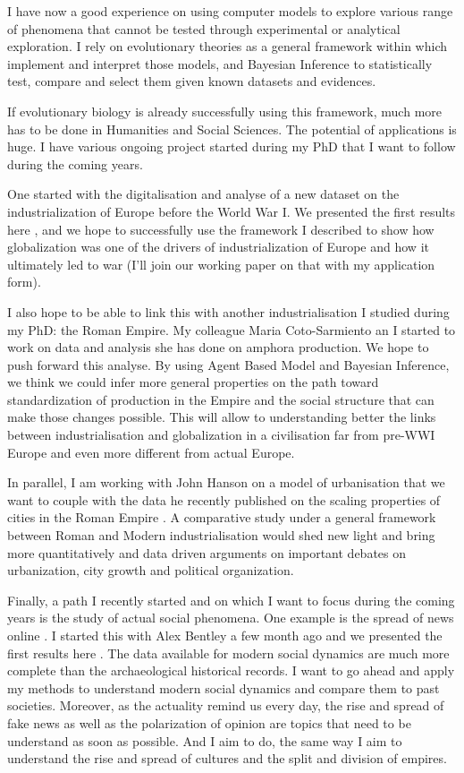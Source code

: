 \documentclass[10pt]{article}
\begin{document}
I have now a good experience on using computer models to explore various range of phenomena that cannot be tested through experimental or analytical exploration. I rely on evolutionary theories as a general framework within which implement and interpret those models, and Bayesian Inference to statistically test, compare and select them given known datasets and evidences.

If evolutionary biology is already successfully using this framework, much more has to be done in Humanities and Social Sciences. The potential of applications is huge. I have various ongoing project started during my PhD that I want to follow during the coming years.

One started with the digitalisation and analyse of a new dataset on the industrialization of Europe before the World War I. We presented the first results here \cite{carrignon2016patternsinglobalization}, and we hope to successfully use the framework I described to show how globalization was one of the drivers of industrialization of Europe and how it ultimately led to war (I'll join our working paper on that with my application form).

I also hope to be able to link this with another industrialisation I studied during my PhD: the Roman Empire. My colleague Maria Coto-Sarmiento an I started to work on data and analysis she has done on amphora production\cite{COTOSARMIENTO2018117}. We hope to push forward this analyse. By using Agent Based Model and Bayesian Inference, we think we could infer more general properties on the path toward standardization of production in the Empire and the social structure that can make those changes possible.  This will allow to understanding better the links between industrialisation and globalization in a civilisation far from pre-WWI Europe and even more different from actual Europe.

In parallel, I am working with John Hanson on a model of urbanisation that we want to couple with the data he recently published on the scaling properties of cities in the Roman Empire \cite{Hanson20170367}. A comparative study under a general framework between Roman and Modern industrialisation would shed new light and bring more quantitatively and data driven arguments on important debates on urbanization, city growth and political organization.

Finally, a path I recently started and on which I want to focus during the coming years is the study of actual social phenomena.  One example is the spread of news online \cite{carrignon2018}. I started this with Alex Bentley a few month ago and we presented the first results here \cite{carrignon2018}. The data available for modern social dynamics are much more complete than the archaeological historical records.  I want to go ahead and apply my methods to understand modern social dynamics and compare them to past societies.  Moreover, as the actuality remind us every day, the rise and spread of fake news as well as the polarization of opinion are topics that need to be understand as soon as possible.  And I aim to do, the same way I aim to understand the rise and spread of cultures and the split and division of empires. 
\end{document}
